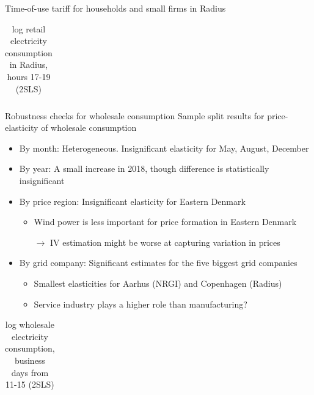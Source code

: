 \begin{frame}{Time-of-use tariff for households and small firms in Radius}
\begin{table}[H]
  \vspace{-0.0cm}
  \centering
  \caption{log retail electricity consumption in Radius, hours 17-19 (2SLS)}
  \footnotesize
    \begin{tabular}{lccc}
      \toprule
        
    \end{tabular}
  \label{tab:hh_17-19}
  \vspace{-0.0cm}
\end{table}
\end{frame}


\begin{frame}{Robustness checks for wholesale consumption}
Sample split results for price-elasticity of wholesale consumption
\begin{itemize}
    \item By month: Heterogeneous. Insignificant elasticity for May, August, December
    \item By year: A small increase in 2018, though difference is statistically insignificant
    \item By price region: Insignificant elasticity for Eastern Denmark
    \begin{itemize}
        \normalsize
        \item Wind power is less important for price formation in Eastern Denmark
        \item[$\rightarrow$] IV estimation might be worse at capturing variation in prices
    \end{itemize}
    \item By grid company: Significant estimates for the five biggest grid companies
    \begin{itemize}
        \normalsize
        \item Smallest elasticities for Aarhus (NRGI) and Copenhagen (Radius)
        \item Service industry plays a higher role than manufacturing?
    \end{itemize}
\end{itemize}
\begin{table}[H]
  \vspace{-0.0cm}
  \centering
  \caption{log wholesale electricity consumption, business days from 11-15 (2SLS)}
  \footnotesize
    \begin{tabular}{lccccc}
      \toprule
        
    \end{tabular}
  \label{tab:ws_grids}
  \vspace{-0.0cm}
\end{table}
\end{frame}

